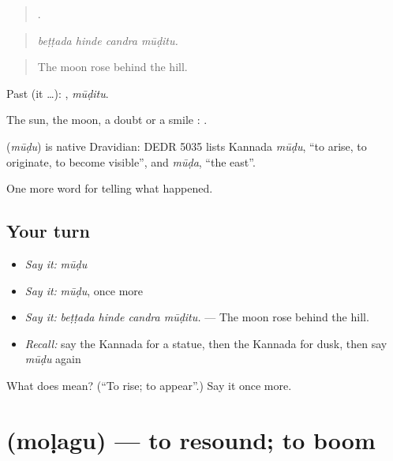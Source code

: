 \begin{quote}
   .
\end{quote}

\begin{quote}
\emph{beṭṭada hinde candra mūḍitu.}
\end{quote}

\begin{quote}
The moon rose behind the hill.
\end{quote}

Past (it …): , \emph{mūḍitu}.

The sun, the moon, a doubt or a smile :   .

\begin{cousinweb}
\textbf{} (\emph{mūḍu}) is native Dravidian: DEDR 5035 lists Kannada \emph{mūḍu}, \textquotedblleft{}to arise, to originate, to become visible\textquotedblright{}, and \emph{mūḍa}, \textquotedblleft{}the east\textquotedblright{}.
\end{cousinweb}

\begin{grammarlens}[title={What you've built}]
One more word for telling what happened.
\end{grammarlens}

\subsection*{Your turn}
\begin{itemize}
\raggedright
  \item \emph{Say it:} \emph{mūḍu}
  \item \emph{Say it:} \emph{mūḍu}, once more
  \item \emph{Say it:} \emph{beṭṭada hinde candra mūḍitu.} — The moon rose behind the hill.
  \item \emph{Recall:} say the Kannada for a statue, then the Kannada for dusk, then say \emph{mūḍu} again
\end{itemize}

\begin{tcolorbox}[breakable,colback=teal!4,colframe=teal!35!black,title={Before you move on}]
What does  mean? (\textquotedblleft{}To rise; to appear\textquotedblright{}.) Say it once more.
\end{tcolorbox}
\section[\texorpdfstring{\kn{ಮೊಳಗು} (moḷagu)}{ಮೊಳಗು (moḷagu)}]{ (moḷagu) — to resound; to boom}

